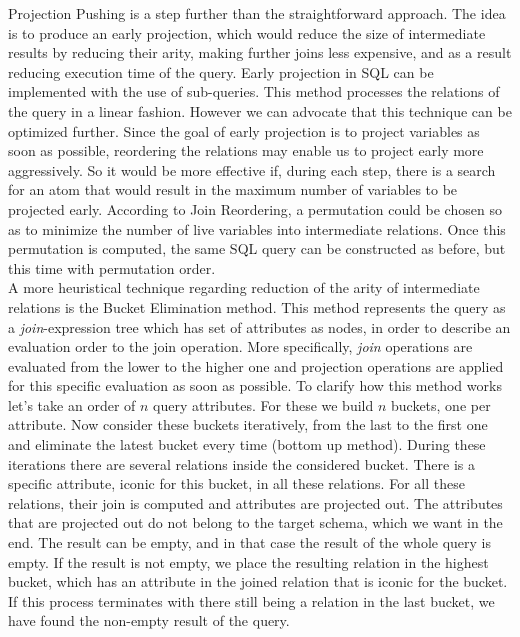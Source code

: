 Projection Pushing is a step further than the straightforward approach. The idea is to produce an early projection, which would reduce the size of intermediate results by reducing their arity, making further joins less expensive, and as a result reducing execution time of the query. Early projection in SQL can be implemented with the use of sub-queries. This method processes the relations of the query in a linear fashion. However we can advocate that this technique can be optimized further. Since the goal of early projection is to project variables as soon as possible, reordering the relations may enable us to project early more aggressively. So it would be more effective if, during each step, there is a search for an atom that would result in the maximum number of variables to be projected early. According to Join Reordering, a permutation could be chosen so as to minimize the number of live variables into intermediate relations. Once this permutation is computed, the same SQL query can be constructed as before, but this time with permutation order. \\

A more heuristical technique regarding reduction of the arity of intermediate relations is the Bucket Elimination method. This method represents the query as a \textit{join}-expression tree which has set of attributes as nodes, in order to describe an evaluation order to the join operation. More specifically, \textit{join} operations are evaluated from the lower to the higher one and projection operations are applied for this specific evaluation as soon as possible. To clarify how this method works let's take an order of $n$ query attributes. For these we build $n$ buckets, one per attribute. Now consider these buckets iteratively, from the last to the first one and eliminate the latest bucket every time (bottom up method). During these iterations there are several relations inside the considered bucket. There is a specific attribute, iconic for this bucket, in all these relations. For all these relations, their join is computed and attributes are projected out. The attributes that are projected out do not belong to the target schema, which we want in the end. The result can be empty, and in that case the result of the whole query is empty. If the result is not empty, we place the resulting relation in the highest bucket, which has an attribute in the joined relation that is iconic for the bucket. If this process terminates with there still being a relation in the last bucket, we have found the non-empty result of the query.